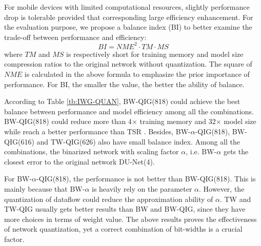 \documentclass[runningheads]{llncs}
\begin{document}
For mobile devices with limited computational resources, slightly performance drop is tolerable provided that corresponding large efficiency enhancement. For the evaluation purpose, we propose a balance index (BI) to better examine the trade-off between performance and efficiency: 
\begin{equation} \label{eq:bi}
BI = NME^2 \cdot TM \cdot MS  
\end{equation} 
where $TM$ and $MS$ is respectively short for training memory and model size compression ratios to the original network without quantization. The square of $NME$ is calculated in the above formula to emphasize the prior importance of performance. For BI, the smaller the value, the better the ability of balance.

According to Table \ref{tb:IWG-QUAN}, BW-QIG(818) could achieve the best balance between performance and model efficiency among all the combinations. BW-QIG(818) could reduce more than 4$\times$ training memory and 32$\times$ model size while reach a better performance than TSR \cite{lv2017deep}. Besides, BW-$\alpha$-QIG(818),  BW-QIG(616) and TW-QIG(626) also have small balance index. Among all the combinations, the binarized network with scaling factor $\alpha$, i.e. BW-$\alpha$ gets the closest error to the original network DU-Net(4).


For BW-$\alpha$-QIG(818), the performance is not better than BW-QIG(818). This is mainly because that BW-$\alpha$ is heavily rely on the parameter $\alpha$. However, the quantization of dataflow could reduce the approximation ability of $\alpha$. TW and TW-QIG usually gets better results than BW and BW-QIG, since they have more choices in terms of weight value. The above results proves the effectiveness of network quantization, yet a correct combination of bit-widths is a crucial factor.
\end{document}

